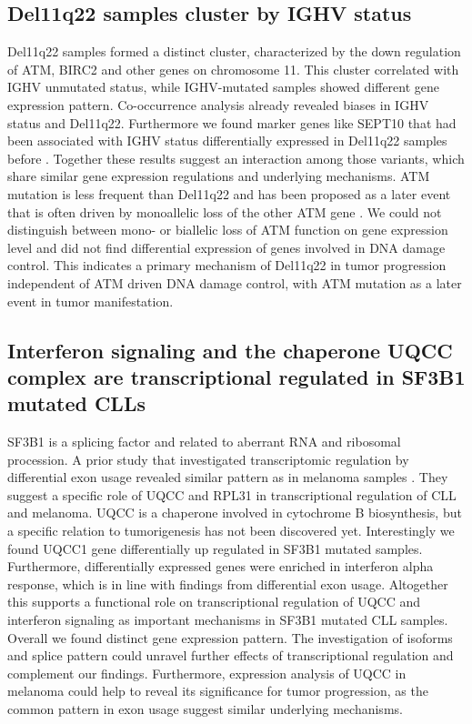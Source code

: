 \subsection{Del11q22 samples cluster by IGHV status}
Del11q22 samples formed a distinct cluster, characterized by the down regulation of ATM, BIRC2 and other genes on chromosome 11. This cluster correlated with IGHV unmutated status, while IGHV-mutated samples showed different gene expression pattern. Co-occurrence analysis already revealed biases in IGHV status and Del11q22. Furthermore we found marker genes like SEPT10 that had been associated with IGHV status differentially expressed in Del11q22 samples before \citep{Benedetti2007}. Together these results suggest an interaction among those variants, which share similar gene expression regulations and underlying mechanisms. ATM mutation is less frequent than Del11q22 and has been proposed as a later event that is often driven by monoallelic loss of the other ATM gene \citep{Landau2015}. We could not distinguish between mono- or biallelic loss of ATM function on gene expression level and did not find differential expression of genes involved in DNA damage control. This indicates a primary mechanism of Del11q22 in tumor progression independent of ATM driven DNA damage control, with ATM mutation as a later event in tumor manifestation.    

\subsection{Interferon signaling and the chaperone UQCC complex are transcriptional regulated in SF3B1 mutated CLLs}
SF3B1 is a splicing factor and related to aberrant RNA and ribosomal procession. A prior study that investigated transcriptomic regulation by differential exon usage revealed similar pattern as in melanoma samples \citep{Reyes}. They suggest a specific role of UQCC and RPL31 in transcriptional regulation of CLL and melanoma. UQCC is a chaperone involved in cytochrome B biosynthesis, but a specific relation to tumorigenesis has not been discovered yet. Interestingly we found UQCC1 gene differentially up regulated in SF3B1 mutated samples. Furthermore, differentially expressed genes were enriched in interferon alpha response, which is in line with findings from differential exon usage. Altogether this supports a functional role on transcriptional regulation of UQCC and interferon signaling as important mechanisms in SF3B1 mutated CLL samples. Overall we found distinct gene expression pattern. The investigation of isoforms and splice pattern could unravel further effects of transcriptional regulation and complement our findings. Furthermore, expression analysis of UQCC in melanoma could help to reveal its significance for tumor progression, as the common pattern in exon usage suggest similar underlying mechanisms. 

